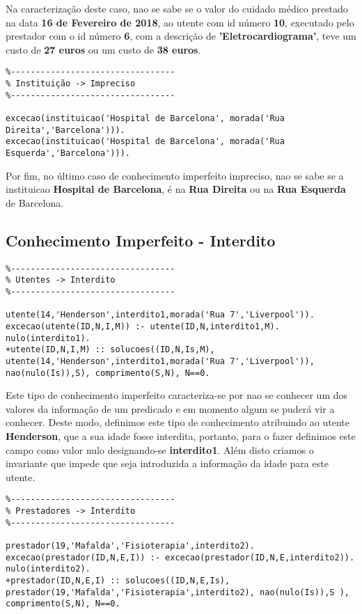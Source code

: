 \documentclass{report}
\begin{document}
Na caracterização deste caso, nao se sabe se o valor do cuidado médico prestado na data \textbf{16 de Fevereiro de 2018}, ao utente com id número \textbf{10}, executado pelo prestador com o id número \textbf{6}, com a descrição de \textbf{'Eletrocardiograma'}, teve um custo de \textbf{27 euros} ou um custo de \textbf{38 euros}.

\begin{verbatim}
%---------------------------------
% Instituição -> Impreciso
%---------------------------------

excecao(instituicao('Hospital de Barcelona', morada('Rua Direita','Barcelona'))).
excecao(instituicao('Hospital de Barcelona', morada('Rua Esquerda','Barcelona'))).
\end{verbatim}

Por fim, no último caso de conhecimento imperfeito impreciso, nao se sabe se a instituicao \textbf{Hospital de Barcelona}, é na \textbf{Rua Direita} ou na \textbf{Rua Esquerda} de Barcelona.

\subsection{Conhecimento Imperfeito - Interdito}
\begin{verbatim}
%---------------------------------
% Utentes -> Interdito
%---------------------------------

utente(14,'Henderson',interdito1,morada('Rua 7','Liverpool')).
excecao(utente(ID,N,I,M)) :- utente(ID,N,interdito1,M).
nulo(interdito1).
+utente(ID,N,I,M) :: solucoes((ID,N,Is,M), utente(14,'Henderson',interdito1,morada('Rua 7','Liverpool')), nao(nulo(Is)),S), comprimento(S,N), N==0.
\end{verbatim}

Este tipo de conhecimento imperfeito caracteriza-se por nao se conhecer um dos valores da informação de um predicado e em momento algum se puderá vir a conhecer. Deste modo, definimos este tipo de conhecimento atribuindo ao utente \textbf{Henderson}, que a sua idade fosse interdita, portanto, para o fazer definimos este campo como valor nulo designando-se \textbf{interdito1}. Além disto criamos o invariante que impede que seja introduzida a informação da idade para este utente.

\begin{verbatim}
%---------------------------------
% Prestadores -> Interdito
%---------------------------------

prestador(19,'Mafalda','Fisioterapia',interdito2).
excecao(prestador(ID,N,E,I)) :- excecao(prestador(ID,N,E,interdito2)).
nulo(interdito2).
+prestador(ID,N,E,I) :: solucoes((ID,N,E,Is), prestador(19,'Mafalda','Fisioterapia',interdito2), nao(nulo(Is)),S ), comprimento(S,N), N==0.
\end{verbatim}
\end{document}
